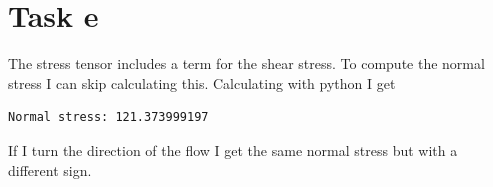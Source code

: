 \documentclass[11pt]{report}
\begin{document}
\section*{Task e}

The stress tensor includes a term for the shear stress. To compute the normal stress I can skip calculating this. Calculating with python I get
\begin{verbatim}
Normal stress: 121.373999197
\end{verbatim}

If I turn the direction of the flow I get the same normal stress but with a different sign.
\end{document}
